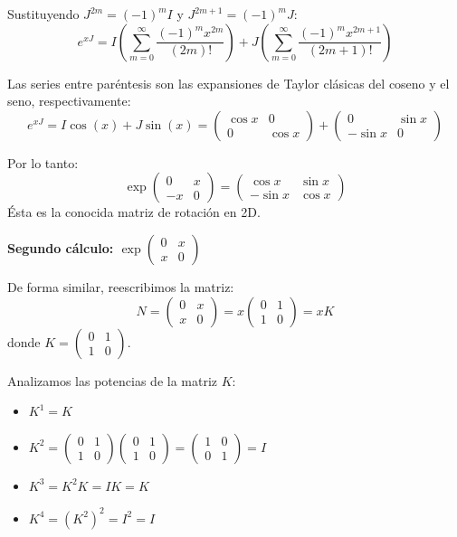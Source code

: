 \documentclass[11pt,spanish]{article}
\begin{document}
\begin{itemize}
Sustituyendo $J^{2m} = (-1)^m I$ y $J^{2m+1} = (-1)^m J$:
$$e^{xJ} = I \left( \sum_{m=0}^{\infty} \frac{(-1)^m x^{2m}}{(2m)!} \right) + J \left( \sum_{m=0}^{\infty} \frac{(-1)^m x^{2m+1}}{(2m+1)!} \right)$$

Las series entre paréntesis son las expansiones de Taylor clásicas del coseno y el seno, respectivamente:
$$e^{xJ} = I \cos(x) + J \sin(x) = \begin{pmatrix} \cos x & 0 \\ 0 & \cos x \end{pmatrix} + \begin{pmatrix} 0 & \sin x \\ -\sin x & 0 \end{pmatrix}$$

Por lo tanto:
$$\exp\begin{pmatrix}0 & x \\ -x & 0\end{pmatrix} = \begin{pmatrix} \cos x & \sin x \\ -\sin x & \cos x \end{pmatrix}$$
 Ésta es la conocida matriz de rotación en 2D.

{\bf Segundo cálculo: $\exp\begin{pmatrix}0 & x \\ x & 0\end{pmatrix}$}

De forma similar, reescribimos la matriz:
$$N = \begin{pmatrix} 0 & x \\ x & 0 \end{pmatrix} = x \begin{pmatrix} 0 & 1 \\ 1 & 0 \end{pmatrix} = x K$$
donde $K = \begin{pmatrix} 0 & 1 \\ 1 & 0 \end{pmatrix}$.

Analizamos las potencias de la matriz $K$:
\begin{itemize}
\item $K^1 = K$
\item $K^2 = \begin{pmatrix} 0 & 1 \\ 1 & 0 \end{pmatrix} \begin{pmatrix} 0 & 1 \\ 1 & 0 \end{pmatrix} = \begin{pmatrix} 1 & 0 \\ 0 & 1 \end{pmatrix} = I$
\item $K^3 = K^2 K = I K = K$
\item $K^4 = (K^2)^2 = I^2 = I$
\end{itemize}


\end{itemize}
\end{document}
